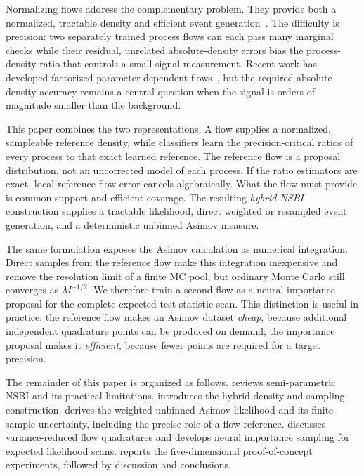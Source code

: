 \documentclass[
  aps,
  prd,
  superscriptaddress,
  nofootinbib,
  longbibliography,
  12pt
]{revtex4-2}
\begin{document}
Normalizing flows address the complementary problem.  They provide both a normalized, tractable density and efficient event generation~\cite{Rezende:2015flows,Dinh:2016realnvp,Durkan:2019splines,Papamakarios:2019flows}.  The difficulty is precision: two separately trained process flows can each pass many marginal checks while their residual, unrelated absolute-density errors bias the process-density ratio that controls a small-signal measurement.  Recent work has developed factorized parameter-dependent flows~\cite{Valsecchi:2026flows}, but the required absolute-density accuracy remains a central question when the signal is orders of magnitude smaller than the background.

This paper combines the two representations.  A flow supplies a normalized, sampleable reference density, while classifiers learn the precision-critical ratios of every process to that exact learned reference.  The reference flow is a proposal distribution, not an uncorrected model of each process.  If the ratio estimators are exact, local reference-flow error cancels algebraically.  What the flow must provide is common support and efficient coverage.  The resulting \emph{hybrid NSBI} construction supplies a tractable likelihood, direct weighted or resampled event generation, and a deterministic unbinned Asimov measure.

The same formulation exposes the Asimov calculation as numerical integration.  Direct samples from the reference flow make this integration inexpensive and remove the resolution limit of a finite MC pool, but ordinary Monte Carlo still converges as $M^{-1/2}$.  We therefore train a second flow as a neural importance proposal for the complete expected test-statistic scan.  This distinction is useful in practice: the reference flow makes an Asimov dataset \emph{cheap}, because additional independent quadrature points can be produced on demand; the importance proposal makes it \emph{efficient}, because fewer points are required for a target precision.

The remainder of this paper is organized as follows.   reviews semi-parametric NSBI and its practical limitations.   introduces the hybrid density and sampling construction.   derives the weighted unbinned Asimov likelihood and its finite-sample uncertainty, including the precise role of a flow reference.   discusses variance-reduced flow quadratures and develops neural importance sampling for expected likelihood scans.   reports the five-dimensional proof-of-concept experiments, followed by discussion and conclusions.
\end{document}
